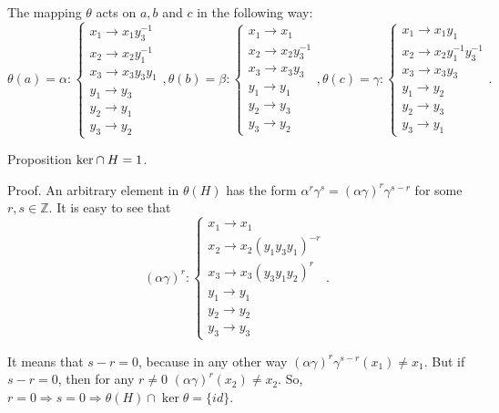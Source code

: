 \documentclass{article}
\begin{document}
The mapping $\theta$ acts on $a, b$ and $c$ in the following way:
$$
\theta(a) = \alpha : 
\begin{cases}
	x_1 \rightarrow x_1 y_3^{-1}\\
	x_2 \rightarrow x_2 y_1^{-1}\\
	x_3 \rightarrow x_3 y_3 y_1\\
	y_1 \rightarrow y_3\\
	y_2 \rightarrow y_1\\
	y_3 \rightarrow y_2
\end{cases},
\theta(b) = \beta :
\begin{cases}
	x_1 \rightarrow x_1\\
	x_2 \rightarrow x_2 y_3^{-1}\\
	x_3 \rightarrow x_3 y_3\\
	y_1 \rightarrow y_1\\
	y_2 \rightarrow y_3\\
	y_3 \rightarrow y_2
\end{cases},
\theta(c) = \gamma :
\begin{cases}
	x_1 \rightarrow x_1 y_1\\
	x_2 \rightarrow x_2 y_1^{-1} y_3^{-1}\\
	x_3 \rightarrow x_3 y_3\\
	y_1 \rightarrow y_2\\
	y_2 \rightarrow y_3\\
	y_3 \rightarrow y_1
\end{cases}.
$$

Proposition ${\rm ker}\cap H=1$. 

Proof. An arbitrary element in $\theta(H)$ has the form $\alpha^r \gamma^s = (\alpha \gamma)^r \gamma^{s-r}$ for some $r,s \in \mathbb{Z}$. It is easy to see that
$$
(\alpha \gamma)^r :
\begin{cases}
	x_1 \rightarrow x_1\\
	x_2 \rightarrow x_2 (y_1 y_3 y_1)^{-r}\\
	x_3 \rightarrow x_3 (y_3 y_1 y_2)^r\\
	y_1 \rightarrow y_1\\
	y_2 \rightarrow y_2\\
	y_3 \rightarrow y_3
\end{cases}.
$$

It means that $s-r = 0$, because in any other way $(\alpha \gamma)^r \gamma^{s-r} (x_1) \neq x_1$. But if $s-r = 0$, then for any $r \neq 0$ $(\alpha \gamma)^r (x_2) \neq x_2$. So, $r = 0 \Rightarrow s = 0 \Rightarrow \theta(H) \cap \ker \theta = \{id\}$.  
\end{document}
